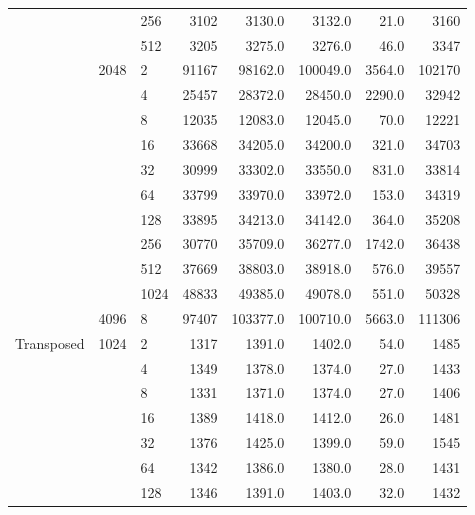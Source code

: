 \begin{tabular}{lllrrrrr}
           &      & 256 &                 3102 &    3130.0 &    3132.0 &     21.0 &    3160 \\
           &      & 512 &                 3205 &    3275.0 &    3276.0 &     46.0 &    3347 \\
           & 2048 & 2 &                91167 &   98162.0 &  100049.0 &   3564.0 &  102170 \\
           &      & 4 &                25457 &   28372.0 &   28450.0 &   2290.0 &   32942 \\
           &      & 8 &                12035 &   12083.0 &   12045.0 &     70.0 &   12221 \\
           &      & 16 &                33668 &   34205.0 &   34200.0 &    321.0 &   34703 \\
           &      & 32 &                30999 &   33302.0 &   33550.0 &    831.0 &   33814 \\
           &      & 64 &                33799 &   33970.0 &   33972.0 &    153.0 &   34319 \\
           &      & 128 &                33895 &   34213.0 &   34142.0 &    364.0 &   35208 \\
           &      & 256 &                30770 &   35709.0 &   36277.0 &   1742.0 &   36438 \\
           &      & 512 &                37669 &   38803.0 &   38918.0 &    576.0 &   39557 \\
           &      & 1024 &                48833 &   49385.0 &   49078.0 &    551.0 &   50328 \\
           & 4096 & 8 &                97407 &  103377.0 &  100710.0 &   5663.0 &  111306 \\
Transposed & 1024 & 2 &                 1317 &    1391.0 &    1402.0 &     54.0 &    1485 \\
           &      & 4 &                 1349 &    1378.0 &    1374.0 &     27.0 &    1433 \\
           &      & 8 &                 1331 &    1371.0 &    1374.0 &     27.0 &    1406 \\
           &      & 16 &                 1389 &    1418.0 &    1412.0 &     26.0 &    1481 \\
           &      & 32 &                 1376 &    1425.0 &    1399.0 &     59.0 &    1545 \\
           &      & 64 &                 1342 &    1386.0 &    1380.0 &     28.0 &    1431 \\
           &      & 128 &                 1346 &    1391.0 &    1403.0 &     32.0 &    1432 \\

\end{tabular}

